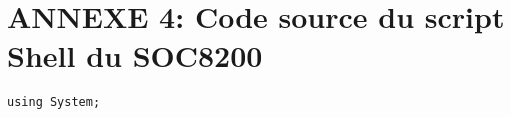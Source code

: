\section{ANNEXE 4: Code source du script Shell du SOC8200}
\begin{lstlisting}
using System;
\end{lstlisting}

